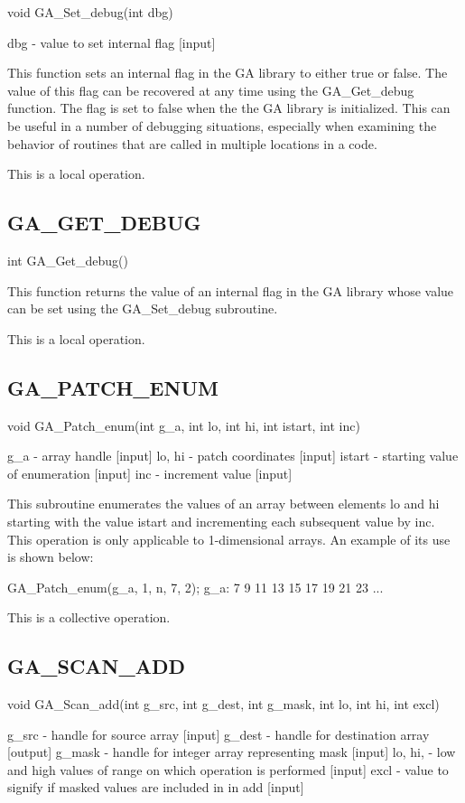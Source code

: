 void GA\_Set\_debug(int dbg)

dbg - value to set internal flag {[}input{]}

This function sets an internal flag in the GA library to either true
or false. The value of this flag can be recovered at any time using
the GA\_Get\_debug function. The flag is set to false when the the
GA library is initialized. This can be useful in a number of debugging
situations, especially when examining the behavior of routines that
are called in multiple locations in a code.

This is a local operation.


\subsection*{GA\_GET\_DEBUG}

int GA\_Get\_debug()

This function returns the value of an internal flag in the GA library
whose value can be set using the GA\_Set\_debug subroutine.

This is a local operation. 


\subsection*{GA\_PATCH\_ENUM}

void GA\_Patch\_enum(int g\_a, int lo, int hi, int istart, int inc)

g\_a - array handle {[}input{]} lo, hi - patch coordinates {[}input{]}
istart - starting value of enumeration {[}input{]} inc - increment
value {[}input{]}

This subroutine enumerates the values of an array between elements
lo and hi starting with the value istart and incrementing each subsequent
value by inc. This operation is only applicable to 1-dimensional arrays.
An example of its use is shown below:

GA\_Patch\_enum(g\_a, 1, n, 7, 2); g\_a: 7 9 11 13 15 17 19 21 23
...

This is a collective operation. 


\subsection*{GA\_SCAN\_ADD}

void GA\_Scan\_add(int g\_src, int g\_dest, int g\_mask, int lo, int
hi, int excl)

g\_src - handle for source array {[}input{]} g\_dest - handle for
destination array {[}output{]} g\_mask - handle for integer array
representing mask {[}input{]} lo, hi, - low and high values of range
on which operation is performed {[}input{]} excl - value to signify
if masked values are included in in add {[}input{]}

